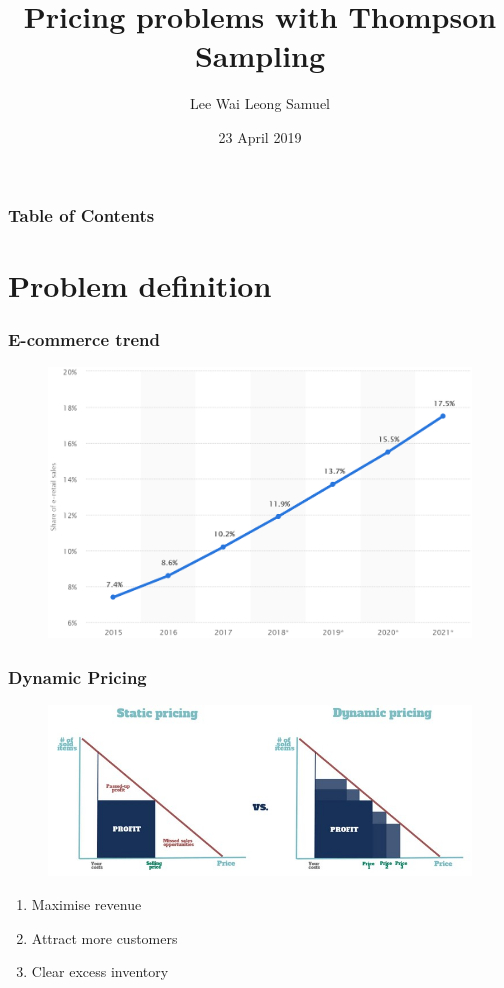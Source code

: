 \documentclass[11pt]{beamer}
\title{Pricing problems with Thompson Sampling}
\author{Lee Wai Leong Samuel}
\institute{Nanyang Technological University}
\date{23 April 2019}
\begin{document}
\frame{\titlepage}

\begin{frame}
\frametitle{Table of Contents}
\tableofcontents
\end{frame}

\section{Problem definition}


\begin{frame}
\frametitle{E-commerce trend}
\begin{figure}[h]
\centering
\includegraphics[width=1\textwidth]{statista.png}
\end{figure}
\end{frame}

\begin{frame}
\frametitle{Dynamic Pricing}
\begin{figure}[h]
\centering
\includegraphics[width=1\textwidth]{dp.jpg}
\end{figure}
\begin{enumerate}
\item Maximise revenue
\item Attract more customers
\item Clear excess inventory
\end{enumerate}
\end{frame}
\end{document}
